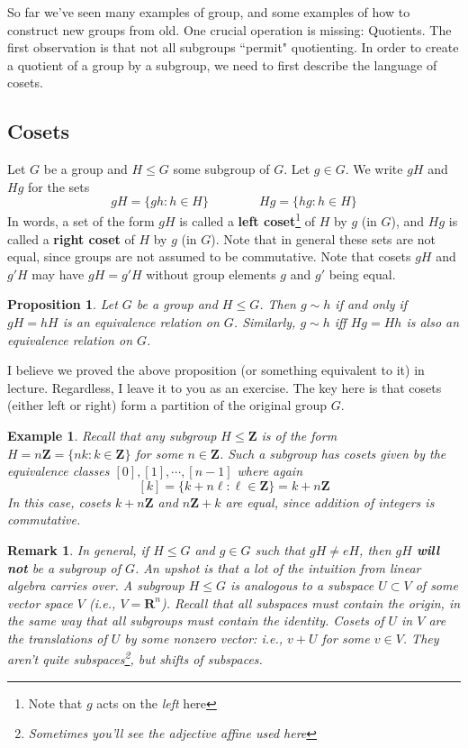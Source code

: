 \documentclass[12pt]{article}
\numberwithin{equation}{subsection}
\newtheorem{prop}[subsection]{Proposition}
\theoremstyle{note}
\newtheorem{example}[subsection]{Example}
\newtheorem{remark}[subsection]{Remark}
\begin{document}
So far we've seen many examples of group, and some examples of how to construct new groups from old. One crucial operation is missing: Quotients. The first observation is that not all subgroups ``permit" quotienting. In order to create a quotient of a group by a subgroup, we need to first describe the language of cosets.

\subsection{Cosets}

Let $G$ be a group and $H\leq G$ some subgroup of $G$. Let $g\in G$. We write $gH$ and $Hg$ for the sets \begin{equation} gH=\{gh : h\in H\} \qquad \qquad Hg=\{hg: h\in H\} \end{equation}
In words, a set of the form $gH$ is called a \textbf{left coset}\footnote{Note that $g$ acts on the \textit{left} here} of $H$ by $g$ (in $G$), and $Hg$ is called a \textbf{right coset} of $H$ by $g$ (in $G$).  Note that in general these sets are not equal, since groups are not assumed to be commutative. Note that cosets $gH$ and $g'H$ may have $gH=g'H$ without group elements $g$ and $g'$ being equal. 

\begin{prop}
	Let $G$ be a group and $H\leq G$. Then $g\sim h$ if and only if $gH=hH$ is an equivalence relation on $G$. Similarly, $g\sim h$ iff $Hg=Hh$ is also an equivalence relation on $G$.
\end{prop}

I believe we proved the above proposition (or something equivalent to it) in lecture. Regardless, I leave it to you as an exercise. The key here is that cosets (either left or right) form a partition of the original group $G$. 

\begin{example} Recall that any subgroup $H\leq \mathbf{Z}$ is of the form $H=n\mathbf{Z}=\{nk: k\in \mathbf{Z}\}$ for some $n\in \mathbf{Z}$. Such a subgroup has cosets given by the equivalence classes $[0], [1], \cdots, [n-1]$ where again \[ [k]=\{k+n\ell : \ell\in\mathbf{Z}\}=k+n\mathbf{Z}\]
In this case, cosets $k+n\mathbf{Z}$ and $n\mathbf{Z}+k$ are equal, since addition of integers is commutative. 
\end{example}

\begin{remark}
	 In general, if $H\leq G$ and $g\in G$ such that $gH\neq eH$, then $gH$ \textbf{will not} be a subgroup of $G$. An upshot is that a lot of the intuition from linear algebra carries over. A subgroup $H\leq G$ is analogous to a \textit{subspace} $U\subset V$ of some vector space $V$ (i.e., $V=\mathbf{R}^n$). Recall that all subspaces must contain the origin, in the same way that all subgroups must contain the identity. Cosets of $U$ in $V$ are the translations of $U$ by some nonzero vector: i.e., $v+U$ for some $v\in V$. They aren't quite subspaces\footnote{Sometimes you'll see the adjective \textit{affine} used here}, but \textit{shifts} of subspaces.
\end{remark}
\end{document}
